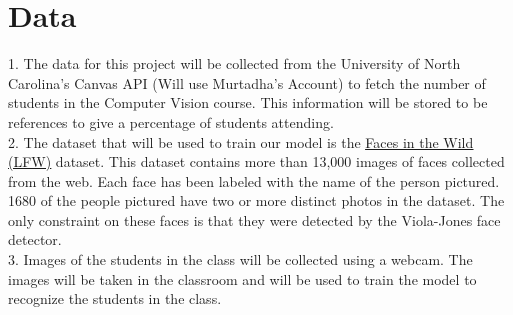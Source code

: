 \section{Data}
1. The data for this project will be collected from the University of North Carolina's Canvas API (Will use Murtadha's Account) to fetch the number of students in the Computer Vision course. This information will be stored to be references to give a percentage of students attending.\\
2. The dataset that will be used to train our model is the \href{http://vis-www.cs.umass.edu/lfw/}{\underline{Faces in the Wild (LFW)}} dataset. This dataset contains more than 13,000 images of faces collected from the web. Each face has been labeled with the name of the person pictured. 1680 of the people pictured have two or more distinct photos in the dataset. The only constraint on these faces is that they were detected by the Viola{-}Jones face detector.\\
3. Images of the students in the class will be collected using a webcam. The images will be taken in the classroom and will be used to train the model to recognize the students in the class.\\
